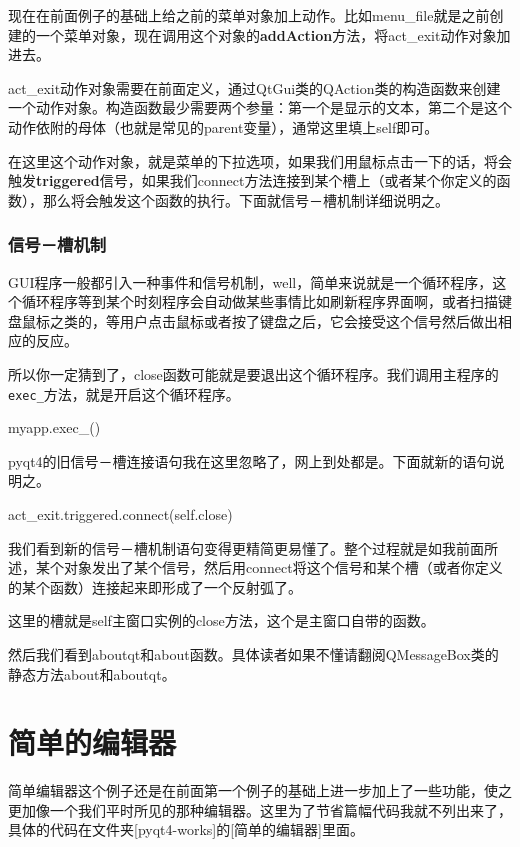 \documentclass[12pt,oneside]{book}
\begin{document}
\begin{common-format}
现在在前面例子的基础上给之前的菜单对象加上动作。比如menu\_{}file就是之前创建的一个菜单对象，现在调用这个对象的\textbf{addAction}方法，将act\_{}exit动作对象加进去。

act\_{}exit动作对象需要在前面定义，通过QtGui类的QAction类的构造函数来创建一个动作对象。构造函数最少需要两个参量：第一个是显示的文本，第二个是这个动作依附的母体（也就是常见的parent变量），通常这里填上self即可。

在这里这个动作对象，就是菜单的下拉选项，如果我们用鼠标点击一下的话，将会触发\textbf{triggered}信号，如果我们connect方法连接到某个槽上（或者某个你定义的函数），那么将会触发这个函数的执行。下面就信号－槽机制详细说明之。

\subsection{信号－槽机制}
GUI程序一般都引入一种事件和信号机制，well，简单来说就是一个循环程序，这个循环程序等到某个时刻程序会自动做某些事情比如刷新程序界面啊，或者扫描键盘鼠标之类的，等用户点击鼠标或者按了键盘之后，它会接受这个信号然后做出相应的反应。

所以你一定猜到了，close函数可能就是要退出这个循环程序。我们调用主程序的\verb+exec_+方法，就是开启这个循环程序。

\begin{tcbpython}
myapp.exec_()
\end{tcbpython}

pyqt4的旧信号－槽连接语句我在这里忽略了，网上到处都是。下面就新的语句说明之。

\begin{tcbpython}
act_exit.triggered.connect(self.close)
\end{tcbpython}

我们看到新的信号－槽机制语句变得更精简更易懂了。整个过程就是如我前面所述，某个对象发出了某个信号，然后用connect将这个信号和某个槽（或者你定义的某个函数）连接起来即形成了一个反射弧了。

这里的槽就是self主窗口实例的close方法，这个是主窗口自带的函数。

然后我们看到aboutqt和about函数。具体读者如果不懂请翻阅QMessageBox类的静态方法about和aboutqt。



\chapter{简单的编辑器}
简单编辑器这个例子还是在前面第一个例子的基础上进一步加上了一些功能，使之更加像一个我们平时所见的那种编辑器。这里为了节省篇幅代码我就不列出来了，具体的代码在文件夹[pyqt4-works]的[简单的编辑器]里面。


\end{common-format}
\end{document}
